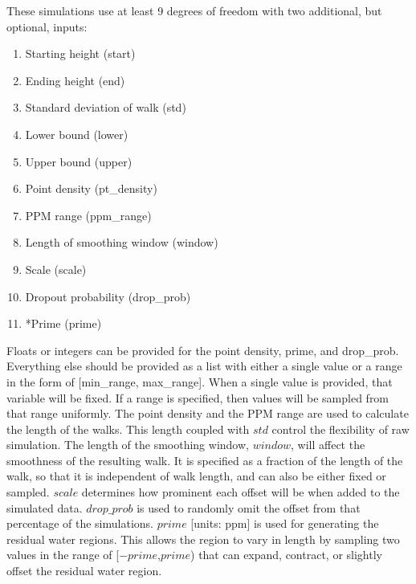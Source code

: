 \documentclass[AMA,LATO1COL]{WileyNJD-v2}
\begin{document}
These simulations use at least 9 degrees of freedom with two additional, but optional, inputs: 
\begin{enumerate}
    \item Starting height (start)
    \item Ending height (end)
    \item Standard deviation of walk (std)
    \item Lower bound (lower)
    \item Upper bound (upper)
    \item Point density (pt\_density)
    \item PPM range (ppm\_range)
    \item Length of smoothing window (window)
    \item Scale (scale)
    \item Dropout probability (drop\_prob)
    \item *Prime (prime)
\end{enumerate}
Floats or integers can be provided for the point density, prime, and drop\_prob. Everything else should be provided as a list with either a single value or a range in the form of [min\_range, max\_range]. When a single value is provided, that variable will be fixed. If a range is specified, then values will be sampled from that range uniformly. The point density and the PPM range are used to calculate the length of the walks. This length coupled with \(std\) control the flexibility of raw simulation. The length of the smoothing window, \(window\), will affect the smoothness of the resulting walk. It is specified as a fraction of the length of the walk, so that it is independent of walk length, and can also be either fixed or sampled. \(scale\) determines how prominent each offset will be when added to the simulated data. \(drop\_prob\) is used to randomly omit the offset from that percentage of the simulations. \(prime\) [units: ppm] is used for generating the residual water regions. This allows the region to vary in length by sampling two values in the range of [\(-prime\),\(prime\)) that can expand, contract, or slightly offset the residual water region.
\end{document}

